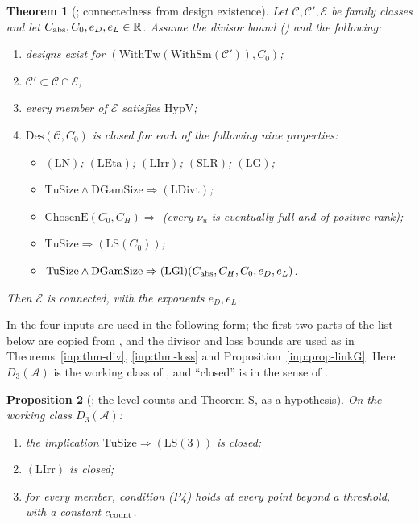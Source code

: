 \documentclass[10pt]{amsart}
\newtheorem{theorem}{Theorem}[section]
\newtheorem{proposition}[theorem]{Proposition}
\theoremstyle{definition}
\theoremstyle{remark}
\newcommand{\R}{\mathbb R}
\begin{document}
\begin{theorem}[{\cite[Theorem~\ref{A-i4:thm-desWin}]{Annex}}; connectedness from design existence]\label{inp:thm-desWin}
Let $\mathcal C,\mathcal C',\mathcal E$ be family classes and let
$C_{\rm abs},C_0,e_D,e_L\in\R$. Assume the divisor bound
\textup{(}\cite[Proposition~\ref{A-i4:hyp-div}]{Annex}\textup{)} and the following:
\begin{enumerate}
\item designs exist for $(\mathrm{WithTw}(\mathrm{WithSm}(\mathcal C')),C_0)$;
\item $\mathcal C'\subset\mathcal C\cap\mathcal E$;
\item every member of $\mathcal E$ satisfies $\mathrm{HypV}$;
\item $\mathrm{Des}(\mathcal C,C_0)$ is closed for each of the following
nine properties:
\begin{itemize}
\item $(\mathrm{LN})$; $(\mathrm{LEta})$; $(\mathrm{LIrr})$;
$(\mathrm{SLR})$; $(\mathrm{LG})$;
\item $\mathrm{TuSize}\wedge\mathrm{DGamSize}\Rightarrow(\mathrm{LDivt})$;
\item $\mathrm{ChosenE}(C_0,C_H)\Rightarrow$ (every $\nu_u$ is eventually
full and of positive rank);
\item $\mathrm{TuSize}\Rightarrow(\mathrm{LS}(C_0))$;
\item $\mathrm{TuSize}\wedge\mathrm{DGamSize}\Rightarrow(\mathrm{LGl})(C_{\rm abs},C_H,C_0,e_D,e_L)$.
\end{itemize}
\end{enumerate}
Then $\mathcal E$ is connected, with the exponents $e_D,e_L$.
\end{theorem}

In \cite[Theorem~\ref{A-i4:thm-final}]{Annex} the four inputs are used in
the following form; the first two parts of the list below are copied from
\cite[Propositions~\ref{A-i4:hyp-S}, \ref{A-i4:hyp-selmer}]{Annex}, and the
divisor and loss bounds are used as in
Theorems~\ref{inp:thm-div}, \ref{inp:thm-loss} and
Proposition~\ref{inp:prop-linkG}. Here $D_3(\mathcal A)$ is the working
class of \cite[\S\ref{A-i4:ssec-links}]{Annex}, and ``closed'' is in the
sense of \cite[Definition~\ref{A-i4:def-closed}]{Annex}.

\begin{proposition}[{\cite[Proposition~\ref{A-i4:hyp-S}]{Annex}}; the level counts and Theorem S, as a hypothesis]\label{inp:prop-hypS}
On the working class $D_3(\mathcal A)$:
\begin{enumerate}
\item[(a)] the implication $\mathrm{TuSize}\Rightarrow(\mathrm{LS}(3))$ is
closed;
\item[(b)] $(\mathrm{LIrr})$ is closed;
\item[(c)] for every member, condition (P4) holds at every point beyond a
threshold, with a constant $c_{\rm count}$.
\end{enumerate}
\end{proposition}
\end{document}
